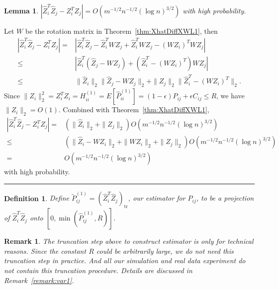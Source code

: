 \documentclass[a4paper]{article}
\newenvironment{proof}{{\bf Proof:  }}{\hfill\rule{2mm}{2mm}}
\newtheorem{lemma}[fact]{Lemma}
\newtheorem{definition}[fact]{Definition}
\newtheorem{remark}[fact]{Remark}
\renewcommand{\hat}{\widehat}
\begin{document}
\begin{lemma}
\label{lemma:1stMomentPhatDiffL1}
$\left|  \hat{Z}_i^T \hat{Z}_j - Z_i^T Z_j \right| = O(m^{-1/2} n^{-1/2} (\log n)^{3/2})$ with high probability.
\end{lemma}
\begin{proof}
Let $W$ be the rotation matrix in Theorem~\ref{thm:XhatDiffXWL1}, then
\begin{align*}
	\left|  \hat{Z}_i^T \hat{Z}_j - Z_i^T Z_j \right|
    = & \left| \hat{Z}_i^T \hat{Z}_j - \hat{Z}_i^T W Z_j + \hat{Z}_i^T W Z_j - (W Z_i)^T W Z_j \right| \\
    \le & \left| \hat{Z}_i^T (\hat{Z}_j - W Z_j) + (\hat{Z}_i^T - (W Z_i)^T) W Z_j \right| \\
    \le & \|\hat{Z}_i\|_2 \|\hat{Z}_j - W Z_j\|_2 + \|Z_j\|_2 \|\hat{Z}_i^T - (W Z_i)^T\|_2.
\end{align*}
Since $\|Z_i\|_2^2 = Z_i^T Z_i = H^{(1)}_{ii} =  E[\hat{P}^{(1)}_{ii}] = (1-\epsilon) P_{ij} + \epsilon C_{ij} \le R$, we have $\|Z_i\|_2 = O(1)$.
Combined with Theorem~\ref{thm:XhatDiffXWL1},
\begin{align*}
    \left|  \hat{Z}_i^T \hat{Z}_j - Z_i^T Z_j \right|
    = & (\|\hat{Z}_i\|_2 + \|Z_j\|_2) O(m^{-1/2} n^{-1/2} (\log n)^{3/2}) \\
    \le & (\|\hat{Z}_i - W Z_i\|_2 + \|W Z_i\|_2 + \|Z_j\|_2) O(m^{-1/2} n^{-1/2} (\log n)^{3/2}) \\
    = & O(m^{-1/2} n^{-1/2} (\log n)^{3/2})
\end{align*}
with high probability.
\end{proof}

\begin{definition}
Define $\widetilde{P}_{ij}^{(1)} = (\hat{Z}_i^T \hat{Z}_j)_{\mathrm{tr}}$, our estimator for $P_{ij}$, to be a projection of $\hat{Z}_i^T \hat{Z}_j$ onto $[0, \min(\hat{P}_{ij}^{(1)}, R)]$.
\end{definition}

\begin{remark}
The truncation step above to construct estimator is only for technical reasons. Since the constant $R$ could be arbitrarily large, we do not need this truncation step in practice. And all our simulation and real data experiment do not contain this truncation procedure. Details are discussed in Remark~\ref{remark:var1}.
\end{remark}
\end{document}
